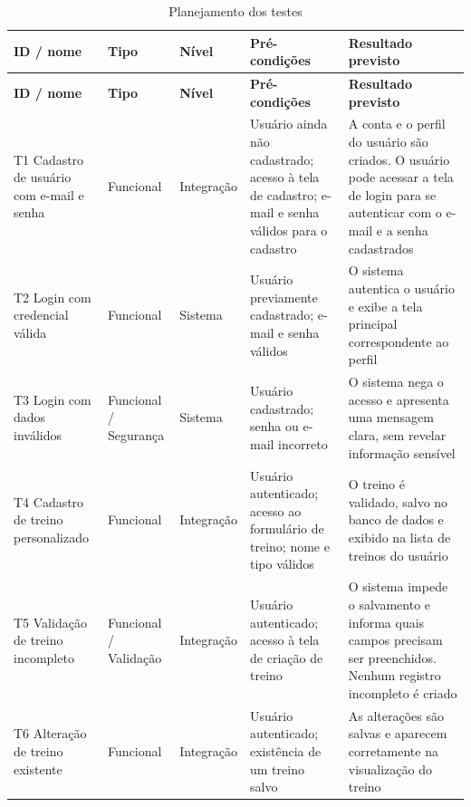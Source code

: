 \begingroup
\small
\setlength{\tabcolsep}{4pt}
\renewcommand{\arraystretch}{1.2}
\begin{longtable}{|>{\raggedright\arraybackslash}p{}|>{\raggedright\arraybackslash}p{}|>{\raggedright\arraybackslash}p{}|>{\raggedright\arraybackslash}p{}|>{\raggedright\arraybackslash}p{}|}
\caption{Planejamento dos testes}\\
\hline
\textbf{ID / nome} & \textbf{Tipo} & \textbf{Nível} & \textbf{Pré-condições} & \textbf{Resultado previsto} \\ \hline
\endfirsthead
\textbf{ID / nome} & \textbf{Tipo} & \textbf{Nível} & \textbf{Pré-condições} & \textbf{Resultado previsto} \\ \hline
\endhead
T1 Cadastro de usuário com e-mail e senha & Funcional & Integração & Usuário ainda não cadastrado; acesso à tela de cadastro; e-mail e senha válidos para o cadastro & A conta e o perfil do usuário são criados. O usuário pode acessar a tela de login para se autenticar com o e-mail e a senha cadastrados \\ \hline
T2 Login com credencial válida & Funcional & Sistema & Usuário previamente cadastrado; e-mail e senha válidos & O sistema autentica o usuário e exibe a tela principal correspondente ao perfil \\ \hline
T3 Login com dados inválidos & Funcional / Segurança & Sistema & Usuário cadastrado; senha ou e-mail incorreto & O sistema nega o acesso e apresenta uma mensagem clara, sem revelar informação sensível \\ \hline
T4 Cadastro de treino personalizado & Funcional & Integração & Usuário autenticado; acesso ao formulário de treino; nome e tipo válidos & O treino é validado, salvo no banco de dados e exibido na lista de treinos do usuário \\ \hline
T5 Validação de treino incompleto & Funcional / Validação & Integração & Usuário autenticado; acesso à tela de criação de treino & O sistema impede o salvamento e informa quais campos precisam ser preenchidos. Nenhum registro incompleto é criado \\ \hline
T6 Alteração de treino existente & Funcional & Integração & Usuário autenticado; existência de um treino salvo & As alterações são salvas e aparecem corretamente na visualização do treino \\ \hline

\end{longtable}
